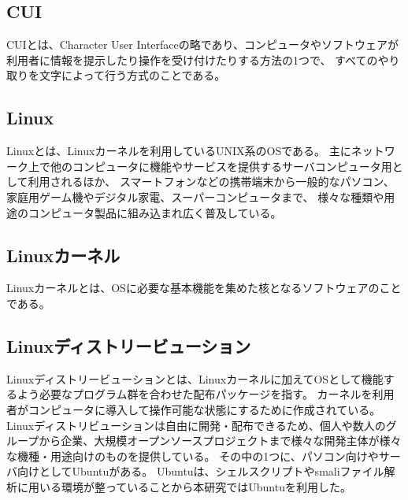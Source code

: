 



\subsection{CUI}
CUIとは、Character User Interfaceの略であり、コンピュータやソフトウェアが利用者に情報を提示したり操作を受け付けたりする方法の1つで、
すべてのやり取りを文字によって行う方式のことである。


\subsection{Linux}
Linuxとは、Linuxカーネルを利用しているUNIX系のOSである。
主にネットワーク上で他のコンピュータに機能やサービスを提供するサーバコンピュータ用として利用されるほか、
スマートフォンなどの携帯端末から一般的なパソコン、家庭用ゲーム機やデジタル家電、スーパーコンピュータまで、
様々な種類や用途のコンピュータ製品に組み込まれ広く普及している。


\subsection{Linuxカーネル}
Linuxカーネルとは、OSに必要な基本機能を集めた核となるソフトウェアのことである。


\subsection{Linuxディストリービューション}
Linuxディストリービューションとは、Linuxカーネルに加えてOSとして機能するよう必要なプログラム群を合わせた配布パッケージを指す。
カーネルを利用者がコンピュータに導入して操作可能な状態にするために作成されている。
Linuxディストリビューションは自由に開発・配布できるため、個人や数人のグループから企業、大規模オープンソースプロジェクトまで様々な開発主体が様々な機種・用途向けのものを提供している。
その中の1つに、パソコン向けやサーバ向けとしてUbuntuがある。
Ubuntuは、シェルスクリプトやsmaliファイル解析に用いる環境が整っていることから本研究ではUbuntuを利用した。


